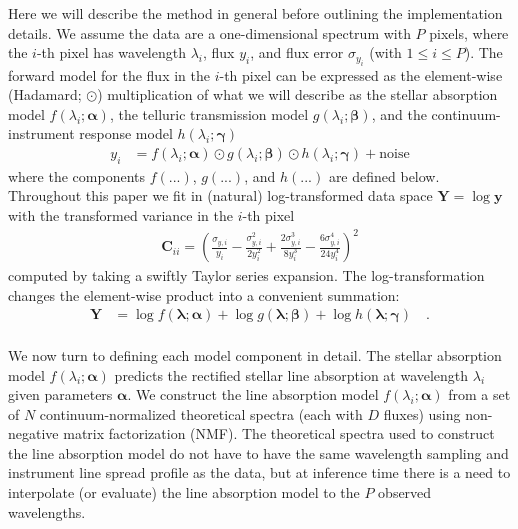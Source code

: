 \documentclass[modern]{aastex631}
\renewcommand{\vec}[1]{\mathbf{#1}}
\newcommand{\vecalpha}{\boldsymbol{\alpha}}
\newcommand{\vecbeta}{\boldsymbol{\beta}}
\newcommand{\vecgamma}{\boldsymbol{\gamma}}
\newcommand{\hadamard}{\odot}
\begin{document}

Here we will describe the method in general before outlining the implementation details. We assume the data are a one-dimensional spectrum with $P$ pixels, where the $i$-th pixel has wavelength $\lambda_i$, flux $y_i$, and flux error $\sigma_{y_i}$ (with $1 \leq i \leq P$). The forward model for the flux in the $i$-th pixel can be expressed as the element-wise (Hadamard; $\hadamard$) multiplication of what we will describe as the stellar absorption model $f(\lambda_i; \vecalpha)$, the telluric transmission model $g(\lambda_i; \vecbeta)$, and the continuum-instrument response model $h(\lambda_i;\vecgamma)$
\begin{align}
    y_i &= f(\lambda_i;\vecalpha)\hadamard{}g(\lambda_i;\vecbeta)\hadamard{}h(\lambda_i;\vecgamma) + \mbox{noise}
\end{align}
where the components $f(...)$, $g(...)$, and $h(...)$ are defined below. Throughout this paper we fit in (natural) log-transformed data space $\vec{Y} = \log{\vec{y}}$ with the transformed variance in the $i$-th pixel
\begin{eqnarray}
    \vec{C}_{ii} = \left(\frac{\sigma_{y,i}}{y_i} - \frac{\sigma_{y,i}^2}{2y_i^2} + \frac{2\sigma_{y,i}^3}{8y_i^3} - \frac{6\sigma_{y,i}^4}{24y_i^4}\right)^2
\end{eqnarray}
\noindent{}computed by taking a swiftly Taylor series expansion. The log-transformation changes the element-wise product into a convenient summation:
\begin{align}
    \label{eq:log_y}
    \vec{Y} &= \log{f(\vec{\lambda}; \vecalpha)} + \log{g(\vec{\lambda};\vecbeta)} + \log{h(\vec{\lambda};\vecgamma)} \quad .
\end{align}\\

We now turn to defining each model component in detail.
The stellar absorption model $f(\lambda_i;\vecalpha)$ predicts the rectified stellar line absorption at wavelength $\lambda_i$ given parameters $\vecalpha$. We construct the line absorption model $f(\lambda_i;\vecalpha)$ from a set of $N$ continuum-normalized theoretical spectra (each with $D$ fluxes) using non-negative matrix factorization (NMF).
The theoretical spectra used to construct the line absorption model do not have to have the same wavelength sampling and instrument line spread profile as the data, but at inference time there is a need to interpolate (or evaluate) the line absorption model to the $P$ observed wavelengths.\\
\end{document}
